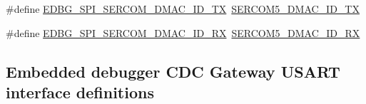 \begin{DoxyCompactItemize}
\item 
\#define \mbox{\hyperlink{group__samd21__xplained__pro__features__group_ga7c8df75dc99ab45d5f4ac95121b8e2b4}{E\+D\+B\+G\+\_\+\+S\+P\+I\+\_\+\+S\+E\+R\+C\+O\+M\+\_\+\+D\+M\+A\+C\+\_\+\+I\+D\+\_\+\+TX}}~\mbox{\hyperlink{sercom5_8h_a9c1d161a2cff0b7ecf94033780200841}{S\+E\+R\+C\+O\+M5\+\_\+\+D\+M\+A\+C\+\_\+\+I\+D\+\_\+\+TX}}
\item 
\#define \mbox{\hyperlink{group__samd21__xplained__pro__features__group_ga24f7b9591dafc014b6c68f27f45951dc}{E\+D\+B\+G\+\_\+\+S\+P\+I\+\_\+\+S\+E\+R\+C\+O\+M\+\_\+\+D\+M\+A\+C\+\_\+\+I\+D\+\_\+\+RX}}~\mbox{\hyperlink{sercom5_8h_a24944592fdfc7c0821841f8de96c30b0}{S\+E\+R\+C\+O\+M5\+\_\+\+D\+M\+A\+C\+\_\+\+I\+D\+\_\+\+RX}}
\end{DoxyCompactItemize}
\subsection*{Embedded debugger C\+DC Gateway U\+S\+A\+RT interface definitions}
